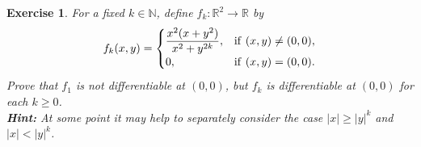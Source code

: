 \documentclass[11pt]{article}
\newtheorem{exercise}{Exercise}[section]
\theoremstyle{definition}
\numberwithin{equation}{subsection}
\begin{document}
\medskip

\begin{exercise}
For a fixed $k \in \mathbb{N}$, define $f_k: \mathbb{R}^2 \to \mathbb{R}$ by
\begin{align*}
    f_k(x,y) = \begin{cases}
        \displaystyle \frac{x^2(x + y^2)}{x^2 + y^{2k}}, & {\rm if}\,\, (x,y) \neq (0,0), \\
        0, & {\rm if}\,\, (x,y) = (0,0).
    \end{cases}
\end{align*}
Prove that $f_1$ is not differentiable at $(0,0)$, but $f_k$ is differentiable at $(0,0)$ for each $k \geq 0$.\\
{\bf Hint:} At some point it may help to separately consider the case $|x| \geq |y|^k$ and $|x| < |y|^k$.
\end{exercise}
\end{document}
